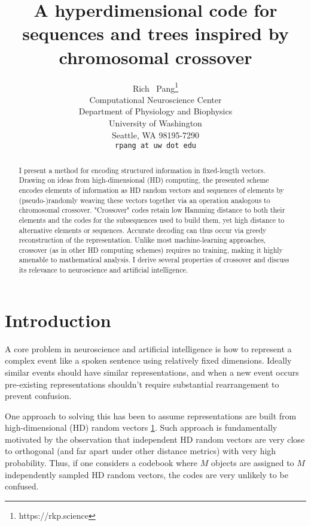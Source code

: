 \documentclass{article}
\title{A hyperdimensional code for sequences and trees inspired by chromosomal crossover}
\author{
  Rich ~Pang\thanks{https://rkp.science} \\
  Computational Neuroscience Center\\
  Department of Physiology and Biophysics\\
  University of Washington\\
  Seattle, WA 98195-7290 \\
  \texttt{rpang at uw dot edu} \\
}
\begin{document}
\maketitle

\begin{abstract}
I present a method for encoding structured information in fixed-length vectors. Drawing on ideas from high-dimensional (HD) computing, the presented scheme encodes elements of information as HD random vectors and sequences of elements by (pseudo-)randomly weaving these vectors together via an operation analogous to chromosomal crossover. "Crossover" codes retain low Hamming distance to both their elements and the codes for the subsequences used to build them, yet high distance to alternative elements or sequences. Accurate decoding can thus occur via greedy reconstruction of the representation. Unlike most machine-learning approaches, crossover (as in other HD computing schemes) requires no training, making it highly amenable to mathematical analysis. I derive several properties of crossover and discuss its relevance to neuroscience and artificial intelligence.
\end{abstract}




\section{Introduction}
A core problem in neuroscience and artificial intelligence is how to represent a complex event like a spoken sentence using relatively fixed dimensions. Ideally similar events should have similar representations, and when a new event occurs pre-existing representations shouldn't require substantial rearrangement to prevent confusion.

One approach to solving this has been to assume representations are built from high-dimensional (HD) random vectors \ref{}. Such approach is fundamentally motivated by the observation that independent HD random vectors are very close to orthogonal (and far apart under other distance metrics) with very high probability. Thus, if one considers a codebook where $M$ objects are assigned to $M$ independently sampled HD random vectors, the codes are very unlikely to be confused. 
\end{document}
